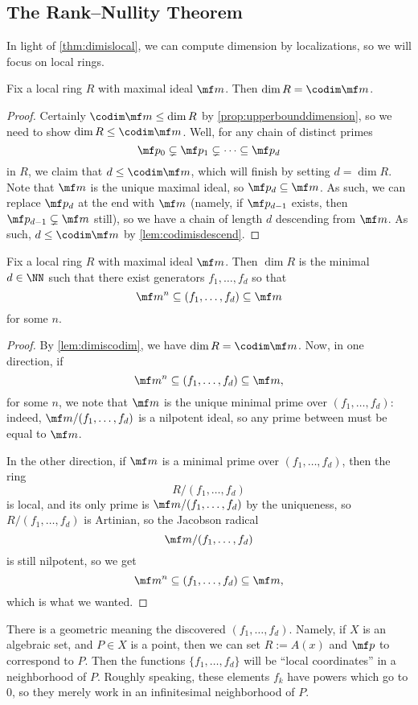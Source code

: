 \subsection{The Rank--Nullity Theorem}
In light of \autoref{thm:dimislocal}, we can compute dimension by localizations, so we will focus on local rings.
\begin{lemma} \label{lem:dimiscodim}
	Fix a local ring $R$ with maximal ideal $\mf m$. Then $\dim R=\codim\mf m$.
\end{lemma}
\begin{proof}
	Certainly $\codim\mf m\le\dim R$ by \autoref{prop:upperbounddimension}, so we need to show $\dim R\le\codim\mf m$. Well, for any chain of distinct primes
	\[\mf p_0\subsetneq\mf p_1\subsetneq\cdots\subseteq\mf p_d\]
	in $R$, we claim that $d\le\codim\mf m$, which will finish by setting $d=\dim R$. Note that $\mf m$ is the unique maximal ideal, so $\mf p_d\subseteq\mf m$. As such, we can replace $\mf p_d$ at the end with $\mf m$ (namely, if $\mf p_{d-1}$ exists, then $\mf p_{d-1}\subsetneq\mf m$ still), so we have a chain of length $d$ descending from $\mf m$. As such, $d\le\codim\mf m$ by \autoref{lem:codimisdescend}.
\end{proof}
\begin{proposition} \label{prop:localdimension}
	Fix a local ring $R$ with maximal ideal $\mf m$. Then $\dim R$ is the minimal $d\in\NN$ such that there exist generators $f_1,\ldots,f_d$ so that
	\[\mf m^n\subseteq(f_1,\ldots,f_d)\subseteq\mf m\]
	for some $n$.
\end{proposition}
\begin{proof}
	By \autoref{lem:dimiscodim}, we have $\dim R=\codim\mf m$. Now, in one direction, if
	\[\mf m^n\subseteq(f_1,\ldots,f_d)\subseteq\mf m,\]
	for some $n$, we note that $\mf m$ is the unique minimal prime over $(f_1,\ldots,f_d)$: indeed, $\mf m/(f_1,\ldots,f_d)$ is a nilpotent ideal, so any prime between must be equal to $\mf m$.
	
	In the other direction, if $\mf m$ is a minimal prime over $(f_1,\ldots,f_d)$, then the ring
	\[R/(f_1,\ldots,f_d)\]
	is local, and its only prime is $\mf m/(f_1,\ldots,f_d)$ by the uniqueness, so $R/(f_1,\ldots,f_d)$ is Artinian, so the Jacobson radical
	\[\mf m/(f_1,\ldots,f_d)\]
	is still nilpotent, so we get
	\[\mf m^n\subseteq(f_1,\ldots,f_d)\subseteq\mf m,\]
	which is what we wanted.
\end{proof}
\begin{remark}
	There is a geometric meaning the discovered $(f_1,\ldots,f_d)$. Namely, if $X$ is an algebraic set, and $P\in X$ is a point, then we can set $R:=A(x)$ and $\mf p$ to correspond to $P$. Then the functions $\{f_1,\ldots,f_d\}$ will be ``local coordinates'' in a neighborhood of $P$. Roughly speaking, these elements $f_k$ have powers which go to $0$, so they merely work in an infinitesimal neighborhood of $P$.
\end{remark}
